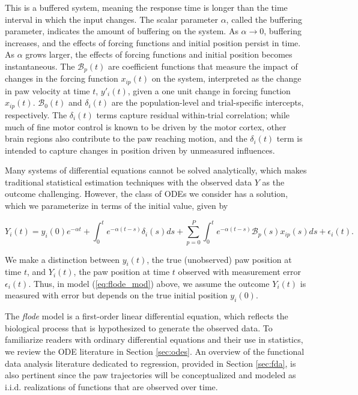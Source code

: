 \documentclass[preprint]{JASA}
\begin{document}
This is a buffered system, meaning the response time is longer than the
time interval in which the input changes. The scalar parameter
\(\alpha\), called the buffering parameter, indicates the amount of
buffering on the system. As \(\alpha \to 0\), buffering increases, and
the effects of forcing functions and initial position persist in time.
As \(\alpha\) grows larger, the effects of forcing functions and initial
position becomes instantaneous. The \(\mathcal{B}_p(t)\) are coefficient
functions that measure the impact of changes in the forcing function
\(x_{ip}(t)\) on the system, interpreted as the change in paw velocity
at time \(t\), \(y'_i(t)\), given a one unit change in forcing function
\(x_{ip}(t)\). \(\mathcal{B}_0(t)\) and \(\delta_i(t)\) are the
population-level and trial-specific intercepts, respectively. The
\(\delta_i(t)\) terms capture residual within-trial correlation; while
much of fine motor control is known to be driven by the motor cortex,
other brain regions also contribute to the paw reaching motion, and the
\(\delta_i(t)\) term is intended to capture changes in position driven
by unmeasured influences.

Many systems of differential equations cannot be solved analytically,
which makes traditional statistical estimation techniques with the
observed data \(Y\) as the outcome challenging. However, the class of
ODEs we consider has a solution, which we parameterize in terms of the
initial value, given by

\begin{equation}
\label{eq:flode_mod}    
    Y_i(t) = y_i(0)e^{-\alpha t} + \int_0^t e^{-\alpha (t-s)}\delta_i(s)ds + \sum_{p=0}^P\int_0^t e^{-\alpha (t-s)} \mathcal{B}_p(s)x_{ip}(s)ds + \epsilon_i(t).
\end{equation}

\noindent We make a distinction between \(y_i(t)\), the true
(unobserved) paw position at time \(t\), and \(Y_i(t)\), the paw
position at time \(t\) observed with measurement error
\(\epsilon_i(t)\). Thus, in model (\ref{eq:flode_mod}) above, we assume
the outcome \(Y_i(t)\) is measured with error but depends on the true
initial position \(y_i(0)\).

The \emph{flode} model is a first-order linear differential equation,
which reflects the biological process that is hypothesized to generate
the observed data. To familiarize readers with ordinary differential
equations and their use in statistics, we review the ODE literature in
Section \ref{sec:odes}. An overview of the functional data analysis
literature dedicated to regression, provided in Section \ref{sec:fda},
is also pertinent since the paw trajectories will be conceptualized and
modeled as i.i.d. realizations of functions that are observed over time.
\end{document}
